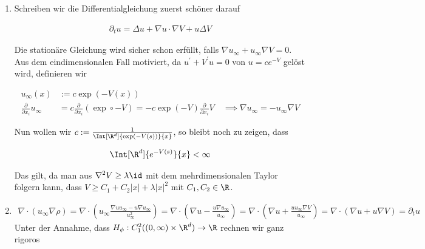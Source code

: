 
\begin{solution}

\phantom{}
\begin{enumerate}[label = (\roman*)]
  \item Schreiben wir die Differentialgleichung zuerst schöner darauf

  \begin{align*}
    \partial_t u
    =
    \Delta u + \nabla u \cdot \nabla V + u \Delta V
  \end{align*}

  Die stationäre Gleichung wird sicher schon erfüllt, falls $\nabla u_\infty + u_\infty \nabla V = 0$. Aus dem eindimensionalen Fall motiviert, da $u^\prime + V^\prime u = 0$ von $u = ce^{-V}$ gelöst wird, definieren wir

  \begin{align*}
    u_\infty(x)
    &:=
    c \exp(-V(x)) \\
    \frac{\partial}{\partial x_i} u_\infty
    &=
    c \frac{\partial}{\partial x_i} (\exp \circ -V)
    =
    - c \exp(-V) \frac{\partial}{\partial x_i} V
    \quad
    \implies
    \nabla u_\infty
    =
    -u_\infty \nabla V
  \end{align*}

  Nun wollen wir $c := \frac{1}{\Int[\R^d]{ \exp(-V(s))}{x}}$, so bleibt noch zu zeigen, dass

  \begin{align*}
    \Int[\R^d] {e^{-V(s)}}{x} < \infty
  \end{align*}

  Das gilt, da man aus $\nabla^2V \geq \lambda \id$ mit dem mehrdimensionalen Taylor folgern kann, dass $V \geq C_1 + C_2|x| + \lambda |x|^2$ mit $C_1, C_2 \in \R$.
  \item
  \begin{align*}
    \nabla \cdot (u_{\infty} \nabla \rho) = \nabla \cdot (u_\infty \frac{\nabla u u_{\infty} -
    u \nabla u_{\infty}}{u_{\infty}^2}) = \nabla \cdot (\nabla u - \frac{u \nabla u_{\infty}}{u_{\infty}})
    = \nabla \cdot (\nabla u + \frac{u u_{\infty} \nabla V}{u_{\infty}})
    = \nabla \cdot (\nabla u + u \nabla V) = \partial_t u
  \end{align*}
  Unter der Annahme, dass $H_\phi: C^2_1((0,\infty) \times \R^d) \rightarrow \R$ rechnen wir ganz rigoros


\end{enumerate}
\end{solution}

